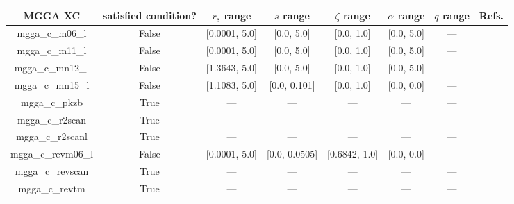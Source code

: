 \begin{tabular}{|c|c|c|c|c|c|c|l|}
\hline
           MGGA XC &  satisfied condition? &   $r_s$ range &     $s$ range & $\zeta$ range & $\alpha$ range & $q$ range  &                                                     Refs. \\ \hline
   mgga\_c\_m06\_l &                 False & [0.0001, 5.0] &    [0.0, 5.0] &    [0.0, 1.0] &     [0.0, 5.0] &        --- &                       \cite{Zhao2006_194101,Zhao2008_215} \\ \hline
   mgga\_c\_m11\_l &                 False & [0.0001, 5.0] &    [0.0, 5.0] &    [0.0, 1.0] &     [0.0, 5.0] &        --- &                                   \cite{Peverati2012_117} \\ \hline
  mgga\_c\_mn12\_l &                 False & [1.3643, 5.0] &    [0.0, 5.0] &    [0.0, 1.0] &     [0.0, 5.0] &        --- &                                 \cite{Peverati2012_13171} \\ \hline
  mgga\_c\_mn15\_l &                 False & [1.1083, 5.0] &  [0.0, 0.101] &    [0.0, 1.0] &     [0.0, 0.0] &        --- &                                        \cite{Yu2016_1280} \\ \hline
     mgga\_c\_pkzb &                  True &           --- &           --- &           --- &            --- &        --- &                                    \cite{Perdew1999_2544} \\ \hline
   mgga\_c\_r2scan &                  True &           --- &           --- &           --- &            --- &        --- &                  \cite{Furness2020_8208,Furness2020_9248} \\ \hline
  mgga\_c\_r2scanl &                  True &           --- &           --- &           --- &            --- &        --- & \cite{Mejia2020_121109,Furness2020_8208,Furness2020_9248} \\ \hline
mgga\_c\_revm06\_l &                 False & [0.0001, 5.0] & [0.0, 0.0505] & [0.6842, 1.0] &     [0.0, 0.0] &        --- &                                      \cite{Wang2017_8487} \\ \hline
  mgga\_c\_revscan &                  True &           --- &           --- &           --- &            --- &        --- &                                     \cite{Mezei2018_2469} \\ \hline
    mgga\_c\_revtm &                  True &           --- &           --- &           --- &            --- &        --- &                                      \cite{Jana2019_6356} \\ \hline

\end{tabular}
